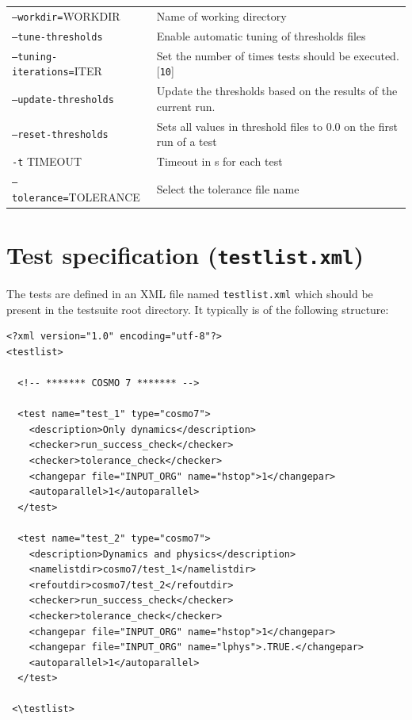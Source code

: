 \documentclass[12pt,twoside,a4paper]{report}
\begin{document}
\begin{longtable}{lp{10cm}}
\texttt{--workdir=}WORKDIR & Name of working directory \\[1.2ex]
\texttt{--tune-thresholds} & Enable automatic tuning of thresholds files \\[1.2ex]
\texttt{--tuning-iterations=}ITER & Set the number of times tests should be executed. [\texttt{10}]\\[1.2ex]
\texttt{--update-thresholds} & Update the thresholds based on the results of the current run. \\[1.2ex]
\texttt{--reset-thresholds} & Sets all values in threshold files to 0.0 on the first run of a test\\[1.2ex]
\texttt{-t} TIMEOUT & Timeout in s for each test\\[1.2ex]
\texttt{--tolerance=}TOLERANCE & Select the tolerance file name\\[1.2ex]
\end{longtable}

\newpage
\section{Test specification (\texttt{testlist.xml})}
\label{sec:testlist}
The tests are defined in an XML file named \texttt{testlist.xml} which should be present in the testsuite root directory. It typically is of the following structure:

\begin{verbatim}
<?xml version="1.0" encoding="utf-8"?>
<testlist>

  <!-- ******* COSMO 7 ******* -->

  <test name="test_1" type="cosmo7">
    <description>Only dynamics</description>
    <checker>run_success_check</checker>
    <checker>tolerance_check</checker>
    <changepar file="INPUT_ORG" name="hstop">1</changepar>
    <autoparallel>1</autoparallel>
  </test>
  
  <test name="test_2" type="cosmo7">
    <description>Dynamics and physics</description>
    <namelistdir>cosmo7/test_1</namelistdir>
    <refoutdir>cosmo7/test_2</refoutdir>
    <checker>run_success_check</checker>
    <checker>tolerance_check</checker>
    <changepar file="INPUT_ORG" name="hstop">1</changepar>
    <changepar file="INPUT_ORG" name="lphys">.TRUE.</changepar>
    <autoparallel>1</autoparallel>
  </test>
  
 <\testlist>
\end{verbatim}
\end{document}
